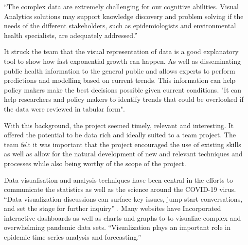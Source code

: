 \vspace{2mm}

“The complex data are extremely challenging for our cognitive abilities. Visual Analytics solutions may support knowledge discovery and problem solving if the needs of the different stakeholders, such as epidemiologists and environmental health specialists, are adequately addressed.”\cite{preim2020survey}

\vspace{5mm}



It struck the team that the visual representation of data is a good explanatory tool to show how fast exponential growth can happen. As well as disseminating public health information to the general public and allows experts to perform predictions and modelling based on current trends. This information can help policy makers make the best decisions possible given current conditions. "It can help researchers and policy makers to identify trends that could be overlooked if the data were reviewed in tabular form". \cite{tebe2020covid19}

\vspace{5mm}







With this background, the project seemed timely, relevant and interesting.
It offered the potential to be data rich and ideally suited to a team project. The team felt it was important that the project encouraged the use of existing skills as well as allow for the natural development of new and relevant techniques and processes while also being worthy of the scope of the project.

\vspace{5mm} %

Data visualisation and analysis techniques have been central in the efforts to communicate the statistics as well as the science around the COVID-19 virus. 
“Data visualization discussions can surface key issues, jump start conversations, and set the stage for further inquiry” \cite{fontichiaro2021using}. Many websites have Incorporated interactive dashboards as well as charts and graphs to to visualize complex and overwhelming pandemic data sets. 
“Visualization plays an important role in epidemic time series analysis and forecasting.”\cite{thorve2018epiviewer}

\vspace{5mm} %

